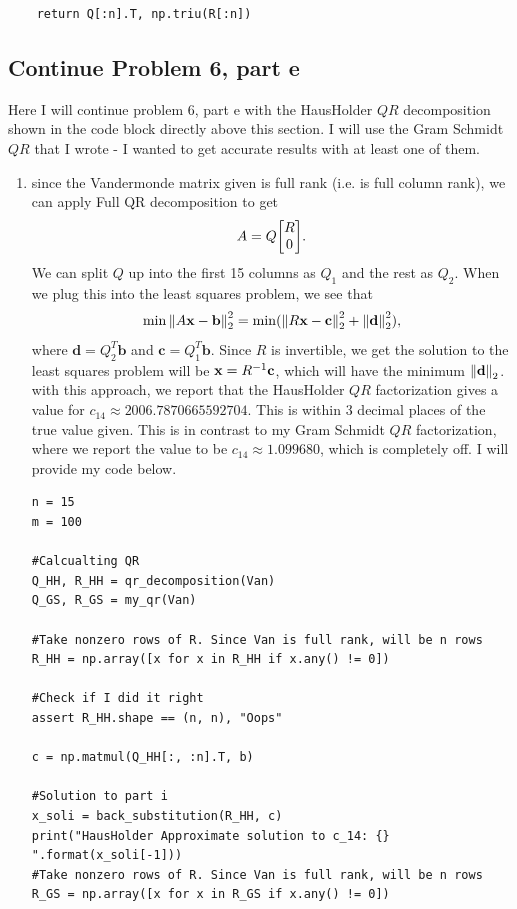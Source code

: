 \begin{solution}
\begin{lstlisting}
    return Q[:n].T, np.triu(R[:n])
\end{lstlisting}

\newpage
\subsection{Continue Problem 6, part e}
Here I will continue problem 6, part e with the HausHolder $QR$ decomposition shown in the code block directly above this section. I will use the Gram Schmidt $QR$ that I wrote - I wanted to get accurate results with at least one of them. 
\begin{enumerate}
    \item since the Vandermonde matrix given is full rank (i.e. is full column rank), we can apply Full QR decomposition to get
    \[
    A = Q\mqty[R\\0].
    \]
    We can split $Q$ up into the first 15 columns as $Q_1$ and the rest as $Q_2$. When we plug this into the least squares problem, we see that
    \[
    \min\norm{A\textbf{x} - \textbf{b}}_2^2 = \min(\norm{R\textbf{x} - \textbf{c}}_2^2 +\norm{\textbf{d}}_2^2),
    \]
    where $\textbf{d} = Q_2^T\textbf{b}$ and $\textbf{c} = Q_1^T\textbf{b}$. Since $R$ is invertible, we get the solution to the least squares problem will be $\textbf{x} = R^{-1} \textbf{c}$, which will have the minimum $\norm{\textbf{d}}_2$. with this approach, we report that the HausHolder $QR$ factorization gives a value for $c_{14} \approx 2006.7870665592704$. This is within 3 decimal places of the true value given. This is in contrast to my Gram Schmidt $QR$ factorization, where we report the value to be $c_{14} \approx 1.099680$, which is completely off. I will provide my code below. 
\begin{lstlisting}
n = 15
m = 100

#Calcualting QR
Q_HH, R_HH = qr_decomposition(Van)
Q_GS, R_GS = my_qr(Van)

#Take nonzero rows of R. Since Van is full rank, will be n rows
R_HH = np.array([x for x in R_HH if x.any() != 0])

#Check if I did it right
assert R_HH.shape == (n, n), "Oops"

c = np.matmul(Q_HH[:, :n].T, b)

#Solution to part i 
x_soli = back_substitution(R_HH, c)
print("HausHolder Approximate solution to c_14: {} ".format(x_soli[-1]))
#Take nonzero rows of R. Since Van is full rank, will be n rows
R_GS = np.array([x for x in R_GS if x.any() != 0])


\end{lstlisting}
\end{enumerate}
\end{solution}
